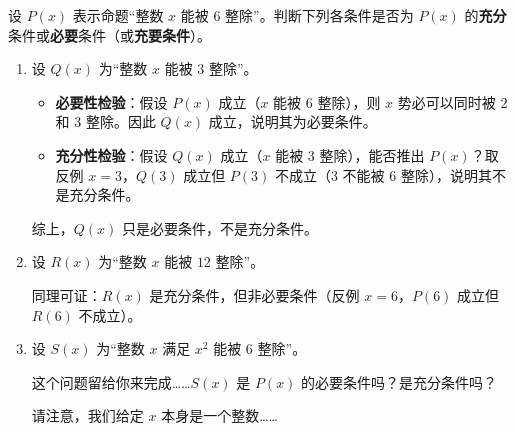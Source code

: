 \begin{example}
    设 $P(x)$ 表示命题``整数 $x$ 能被 $6$ 整除''。判断下列各条件是否为 $P(x)$ 的\textbf{充分}条件或\textbf{必要}条件（或\textbf{充要条件}）。
    \begin{enumerate}[label=(\arabic*)]
        \item 设 $Q(x)$ 为``整数 $x$ 能被 $3$ 整除''。
            \begin{itemize}
                \item \textbf{必要性检验}：假设 $P(x)$ 成立（$x$ 能被 $6$ 整除），则 $x$ 势必可以同时被 $2$ 和 $3$ 整除。因此 $Q(x)$ 成立，说明其为必要条件。
                \item \textbf{充分性检验}：假设 $Q(x)$ 成立（$x$ 能被 $3$ 整除），能否推出 $P(x)$？取反例 $x=3$，$Q(3)$ 成立但 $P(3)$ 不成立（$3$ 不能被 $6$ 整除），说明其不是充分条件。
            \end{itemize}
            综上，$Q(x)$ 只是必要条件，不是充分条件。
        \item 设 $R(x)$ 为``整数 $x$ 能被 $12$ 整除''。
        
            同理可证：$R(x)$ 是充分条件，但非必要条件（反例 $x=6$，$P(6)$ 成立但 $R(6)$ 不成立）。
        \item 设 $S(x)$ 为``整数 $x$ 满足 $x^2$ 能被 $6$ 整除''。
        
            这个问题留给你来完成……$S(x)$ 是 $P(x)$ 的必要条件吗？是充分条件吗？
            
            请注意，我们给定 $x$ 本身是一个整数……
    \end{enumerate}
\end{example}
